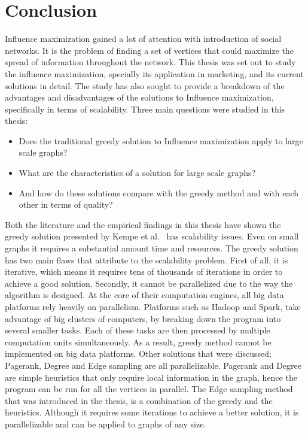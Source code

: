 \documentclass[english]{tktltiki}
\begin{document}
\section{Conclusion}
\label{sec:conclusion}
Influence maximization gained a lot of attention with introduction of social networks. 
It is the problem of finding a set of vertices that could maximize the spread of information throughout the network.
This thesis was set out to study the influence maximization, specially its application in marketing, and its current solutions in detail.
The study has also sought to provide a breakdown of the advantages and disadvantages of the solutions to Influence maximization, specifically in terms of scalability. 
Three main questions were studied in this thesis: 
\begin{itemize}
\item Does the traditional greedy solution to Influence maximization apply to large scale graphs?
\item What are the characteristics of a solution for large scale graphs?
\item And how do these solutions compare with the greedy method and with each other in terms of quality?
\end{itemize}

Both the literature and the empirical findings in this thesis have shown the greedy solution presented by Kempe et al.\ \cite{kempe03} has scalability issues. 
Even on small graphs it requires a substantial amount time and resources.
The greedy solution has two main flaws that attribute to the scalability problem. 
First of all, it is iterative, which means it requires tens of thousands of iterations in order to achieve a good solution.
Secondly, it cannot be parallelized due to the way the algorithm is designed.
At the core of their computation engines, all big data platforms rely heavily on parallelism.
Platforms such as Hadoop and Spark, take advantage of big clusters of computers, by breaking down the program into several smaller tasks.
Each of these tasks are then processed by multiple computation units simultaneously.
As a result, greedy method cannot be implemented on big data platforms.
Other solutions that were discussed; Pagerank, Degree and Edge sampling are all parallelizable.
Pagerank and Degree are simple heuristics that only require local information in the graph, hence the program can be run for all the vertices in parallel.
The Edge sampling method that was introduced in the thesis, is a combination of the greedy and the heuristics.
Although it requires some iterations to achieve a better solution, it is parallelizable and can be applied to graphs of any size.
\end{document}
